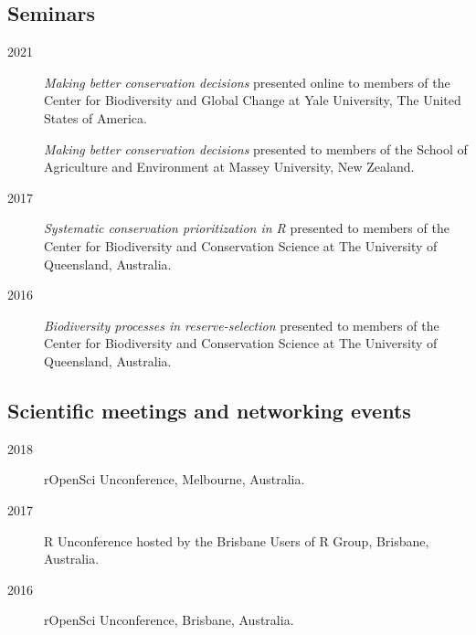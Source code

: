 \documentclass[12pt,a4paper]{article}
\begin{document}
\subsection*{Seminars}
\begin{description}

\item[2021] \textit{Making better conservation decisions} presented online to members of the Center for Biodiversity and Global Change at Yale University, The United States of America.

\item[] \textit{Making better conservation decisions} presented to members of the School of Agriculture and Environment at Massey University, New Zealand.

\item[2017] \textit{Systematic conservation prioritization in R} presented to members of the Center for Biodiversity and Conservation Science at The University of Queensland, Australia.

\item[2016] \textit{Biodiversity processes in reserve-selection} presented to members of the Center for Biodiversity and Conservation Science at The University of Queensland, Australia.

\end{description}

\subsection*{Scientific meetings and networking events}
\begin{description}

\item[2018] rOpenSci Unconference, Melbourne, Australia.

\item[2017] R Unconference hosted by the Brisbane Users of R Group, Brisbane, Australia.

\item[2016] rOpenSci Unconference, Brisbane, Australia.
\end{description}

\clearpage
\end{document}
